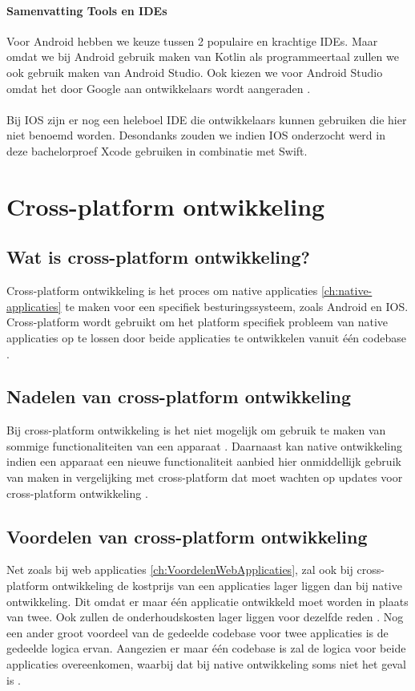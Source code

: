\paragraph{Samenvatting Tools en IDEs}
Voor Android hebben we keuze tussen 2 populaire en krachtige IDEs. Maar omdat we bij Android 
gebruik maken van Kotlin als programmeertaal zullen we ook gebruik maken van Android Studio. 
Ook kiezen we voor Android Studio omdat het door Google aan ontwikkelaars wordt aangeraden 
\autocite{Medewar2022}.
\\\\
Bij IOS zijn er nog een heleboel IDE die ontwikkelaars kunnen gebruiken die hier niet benoemd 
worden. Desondanks zouden we indien IOS onderzocht werd in deze bachelorproef Xcode gebruiken 
in combinatie met Swift.

\section{Cross-platform ontwikkeling}

\subsection{Wat is cross-platform ontwikkeling?}
Cross-platform ontwikkeling is het proces om native applicaties \ref{ch:native-applicaties} 
te maken voor een specifiek besturingssysteem, zoals Android en IOS. Cross-platform wordt 
gebruikt om het platform specifiek probleem van native applicaties op te lossen door beide 
applicaties te ontwikkelen vanuit één codebase \autocite{Khan2021}.

\subsection{Nadelen van cross-platform ontwikkeling}
Bij cross-platform ontwikkeling is het niet mogelijk om gebruik te maken van sommige 
functionaliteiten van een apparaat \autocite{Terekhov2022}. Daarnaast kan native 
ontwikkeling indien een apparaat een nieuwe functionaliteit aanbied hier onmiddellijk gebruik 
van maken in vergelijking met cross-platform dat moet wachten op updates voor cross-platform 
ontwikkeling \autocite{Sakovich22023}.

\subsection{Voordelen van cross-platform ontwikkeling}
Net zoals bij web applicaties \ref{ch:VoordelenWebApplicaties}, zal ook bij cross-platform 
ontwikkeling de kostprijs van een applicaties lager liggen dan bij native ontwikkeling. 
Dit omdat er maar één applicatie ontwikkeld moet worden in plaats van twee. Ook zullen de 
onderhoudskosten lager liggen voor dezelfde reden \autocite{Terekhov2022}. Nog een ander 
groot voordeel van de gedeelde codebase voor twee applicaties is de gedeelde logica ervan. 
Aangezien er maar één codebase is zal de logica voor beide applicaties overeenkomen, waarbij 
dat bij native ontwikkeling soms niet het geval is \autocite{Kotlin2023}.

